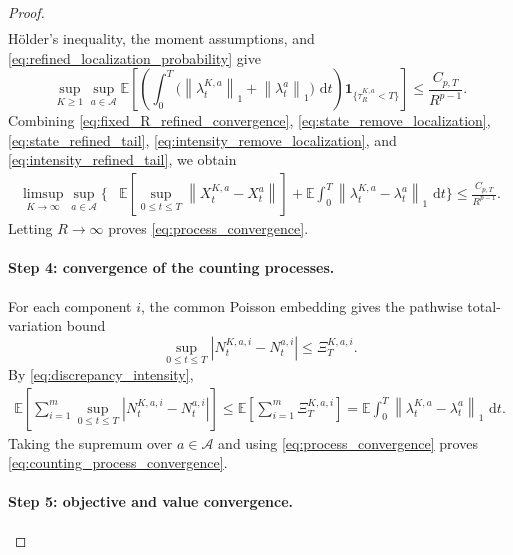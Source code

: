 \documentclass[11pt]{article}
\theoremstyle{remarkitalic}
\theoremstyle{remarkitalic}
\newcommand{\E}{\mathbb E}
\newcommand{\dd}{\,\mathrm d}
\newcommand{\1}{\mathbf 1}
\newcommand{\norm}[1]{\left\lVert #1 \right\rVert}
\newcommand{\abs}[1]{\left\lvert #1\right\rvert}
\begin{document}
{\begin{proof}
\begin{align}
\end{align}
Hölder's inequality, the moment assumptions, and
\eqref{eq:refined_localization_probability} give
\begin{equation}
\label{eq:intensity_refined_tail}
\sup_{K\geq1}\sup_{a\in\mathcal A}
\E\left[
\left(
    \int_0^T
    \bigl(
        \norm{\lambda_t^{K,a}}_1
        +
        \norm{\lambda_t^a}_1
    \bigr)\,\dd t
\right)
\mathbf 1_{\{\tau_R^{K,a}<T\}}
\right]
\leq
\frac{C_{p,T}}{R^{p-1}}.
\end{equation} Combining
\eqref{eq:fixed_R_refined_convergence},
\eqref{eq:state_remove_localization},
\eqref{eq:state_refined_tail},
\eqref{eq:intensity_remove_localization}, and
\eqref{eq:intensity_refined_tail}, we obtain
\[
\begin{aligned}
\limsup_{K\to\infty}
\sup_{a\in\mathcal A}
\Bigg\{
&
\E\left[
    \sup_{0\leq t\leq T}
    \norm{X_t^{K,a}-X_t^a}
\right]+
\E\int_0^T
\norm{\lambda_t^{K,a}-\lambda_t^a}_1\,\dd t
\Bigg\}
\leq
\frac{C_{p,T}}{R^{p-1}}.
\end{aligned}
\]
Letting $R\to\infty$ proves
\eqref{eq:process_convergence}.

\paragraph{Step 4: convergence of the counting processes.}

For each component $i$, the common Poisson embedding gives the
pathwise total-variation bound
\[
\sup_{0\leq t\leq T}
\abs{N_t^{K,a,i}-N_t^{a,i}}
\leq
\Xi_T^{K,a,i}.
\]
By \eqref{eq:discrepancy_intensity},
\[
\begin{aligned}
\E\left[
    \sum_{i=1}^m
    \sup_{0\leq t\leq T}
    \abs{N_t^{K,a,i}-N_t^{a,i}}
\right]
\leq
\E\left[
    \sum_{i=1}^m\Xi_T^{K,a,i}
\right]=
\E\int_0^T
\norm{\lambda_t^{K,a}-\lambda_t^a}_1\,\dd t.
\end{aligned}
\]
Taking the supremum over $a\in\mathcal A$ and using
\eqref{eq:process_convergence} proves
\eqref{eq:counting_process_convergence}.



\paragraph{Step 5: objective and value convergence.}


\end{proof}}
\end{document}

